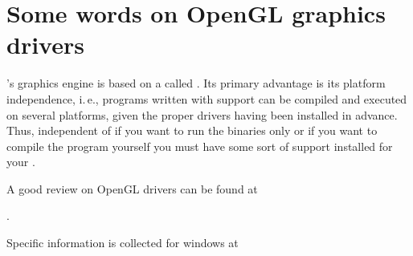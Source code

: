\chapter{Some words on OpenGL graphics drivers\label{opengl}}

\FlightGear{}'s graphics engine is based on a  called
. Its primary advantage is its platform independence, i.\,e., programs
written with  support can be compiled and executed on several platforms,
given the proper drivers having been installed in advance. Thus, independent of if you
want to run the binaries only or if you want to compile the program yourself you must
have some sort of  support installed for your .

A good review  on OpenGL drivers can be found at
\medskip

.
 \medskip

 \noindent
 Specific information is collected for windows at
  \medskip

 \medskip

